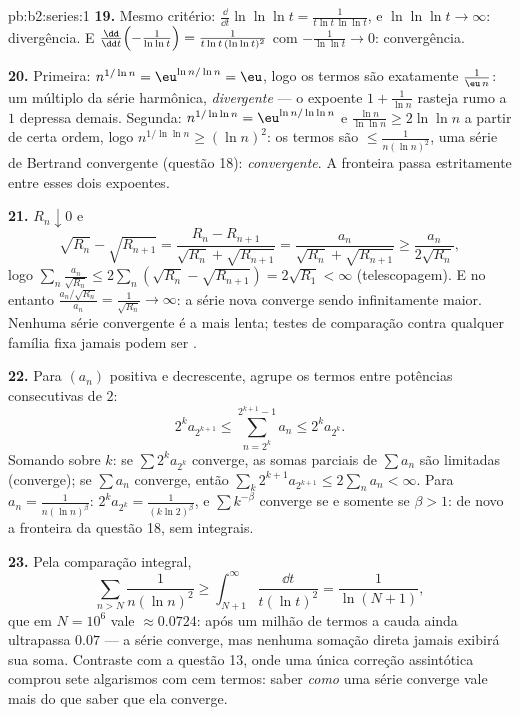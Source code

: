 \begin{solution}{pb:b2:series:1}
\textbf{19.} Mesmo critério: $\frac{\dd}{\dd t}\ln\ln\ln t =
\frac{1}{t\ln t\,\ln\ln t}$, e $\ln\ln\ln t \to \infty$:
divergência. E $\frac{\dd}{\dd t}\Bigl(-\frac1{\ln\ln t}\Bigr)
= \frac{1}{t\ln t\,(\ln\ln t)^2}$ com $-\frac1{\ln\ln t} \to
0$: convergência.

\textbf{20.} Primeira: $n^{1/\ln n} = \eu^{\ln n/\ln n} = \eu$, logo
os termos são exatamente $\frac{1}{\eu\,n}$: um múltiplo da
série harmônica, \emph{divergente} --- o expoente $1 +
\frac1{\ln n}$ rasteja rumo a $1$ depressa demais. Segunda: $n^{1/\ln\ln n}
= \eu^{\ln n/\ln\ln n}$ e $\frac{\ln n}{\ln\ln n} \geq
2\ln\ln n$ a partir de certa ordem, logo $n^{1/\ln\ln n} \geq (\ln n)^2$: os
termos são $\leq \frac1{n(\ln n)^2}$, uma série de Bertrand convergente
(questão 18): \emph{convergente}. A fronteira passa
estritamente entre esses dois expoentes.

\textbf{21.} $R_n \downarrow 0$ e
\[
\sqrt{R_n} - \sqrt{R_{n+1}} = \frac{R_n -
R_{n+1}}{\sqrt{R_n} + \sqrt{R_{n+1}}} =
\frac{a_n}{\sqrt{R_n} + \sqrt{R_{n+1}}} \geq
\frac{a_n}{2\sqrt{R_n}},
\]
logo $\sum_n \frac{a_n}{\sqrt{R_n}} \leq 2\sum_n(\sqrt{R_n} -
\sqrt{R_{n+1}}) = 2\sqrt{R_1} < \infty$ (telescopagem). E no entanto
$\frac{a_n/\sqrt{R_n}}{a_n} = \frac1{\sqrt{R_n}} \to \infty$:
a série nova converge sendo infinitamente maior. Nenhuma
série convergente é a mais lenta; testes de comparação contra qualquer
família fixa jamais podem ser .

\textbf{22.} Para $(a_n)$ positiva e decrescente, agrupe os termos
entre potências consecutivas de $2$:
\[
2^{k}a_{2^{k+1}} \leq \sum_{n=2^k}^{2^{k+1}-1} a_n \leq
2^ka_{2^k} .
\]
Somando sobre $k$: se $\sum 2^ka_{2^k}$ converge, as somas
parciais de $\sum a_n$ são limitadas (converge); se $\sum a_n$
converge, então $\sum_k 2^{k+1}a_{2^{k+1}} \leq 2\sum_n a_n <
\infty$. Para $a_n = \frac1{n(\ln n)^\beta}$: $2^ka_{2^k} =
\frac{1}{(k\ln 2)^\beta}$, e $\sum k^{-\beta}$ converge se e somente se
$\beta > 1$: de novo a fronteira da questão 18, sem
integrais.

\textbf{23.} Pela comparação integral,
\[
\sum_{n > N}\frac{1}{n(\ln n)^2} \geq
\int_{N+1}^{\infty}\frac{\dd t}{t(\ln t)^2} =
\frac{1}{\ln(N+1)},
\]
que em $N = 10^6$ vale $\approx 0.0724$: após um milhão de termos
a cauda ainda ultrapassa $0.07$ --- a série converge, mas nenhuma
somação direta jamais exibirá sua soma. Contraste com
a questão 13, onde uma única correção assintótica comprou sete
algarismos com cem termos: saber \emph{como} uma série
converge vale mais do que saber que ela converge.


\end{solution}
